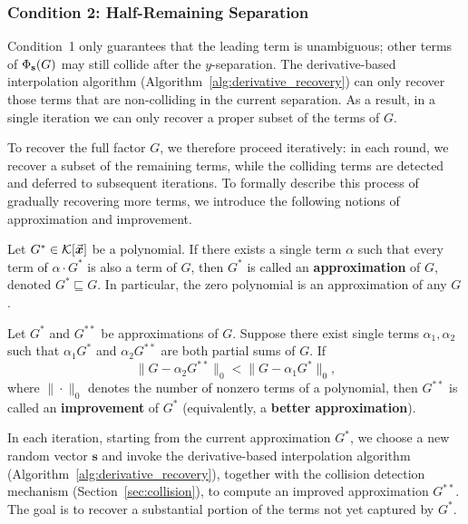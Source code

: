 \documentclass{article}
\numberwithin{equation}{section}
\begin{document}
\subsubsection*{Condition 2: Half-Remaining Separation}

Condition~1 only guarantees that the leading term is unambiguous; other terms of $\Phi_{\mathbf{s}}(G)$ may still collide after the $y$-separation. The derivative-based interpolation algorithm (Algorithm~\ref{alg:derivative_recovery}) can only recover those terms that are non-colliding in the current separation. As a result, in a single iteration we can only recover a proper subset of the terms of $G$.

To recover the full factor $G$, we therefore proceed iteratively: in each round, we recover a subset of the remaining terms, while the colliding terms are detected and deferred to subsequent iterations. To formally describe this process of gradually recovering more terms, we introduce the following notions of approximation and improvement.

\begin{definition}[Approximation]\label{def-appro}
Let $G^* \in {\mathcal{K}}[\vec{\boldsymbol{x}}]$ be a polynomial. If there exists a single term $\alpha$ such that every term of $\alpha \cdot G^*$ is also a term of $G$, then $G^*$ is called an \textbf{approximation} of $G$, denoted $G^* \sqsubseteq G$. In particular, the zero polynomial is an approximation of any $G$.
\end{definition}

\begin{definition}[Improvement]
Let $G^*$ and $G^{**}$ be approximations of $G$. Suppose there exist single terms $\alpha_1, \alpha_2$ such that $\alpha_1 G^*$ and $\alpha_2 G^{**}$ are both partial sums of $G$. If
\[
\|G - \alpha_2 G^{**}\|_0 < \|G - \alpha_1 G^*\|_0,
\]
where $\|\cdot\|_0$ denotes the number of nonzero terms of a polynomial, then $G^{**}$ is called an \textbf{improvement} of $G^*$ (equivalently, a \textbf{better approximation}).
\end{definition}

In each iteration, starting from the current approximation $G^*$, we choose a new random vector $\mathbf{s}$ and invoke the derivative-based interpolation algorithm (Algorithm~\ref{alg:derivative_recovery}), together with the collision detection mechanism (Section~\ref{sec:collision}), to compute an improved approximation $G^{**}$. The goal is to recover a substantial portion of the terms not yet captured by $G^*$.
\end{document}
